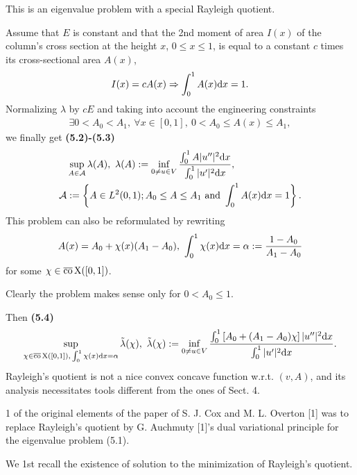 \documentclass{book}
\numberwithin{equation}{section}
\begin{document}
\begin{enumerate}
    This is an eigenvalue problem with a special Rayleigh quotient.
    
    Assume that $E$ is constant and that the 2nd moment of area $I(x)$ of the column's cross section at the height $x$, $0\le x\le 1$, is equal to a constant $c$ times its cross-sectional area $A(x)$,
    \begin{align*}
        I(x) = cA(x)\Rightarrow\int_0^1 A(x){\rm d}x = 1.
    \end{align*}
    Normalizing $\lambda$ by $cE$ and taking into account the engineering constraints
    \begin{align*}
        \exists 0 < A_0 < A_1,\ \forall x\in[0,1],\ 0 < A_0\le A(x)\le A_1,
    \end{align*}
    we finally get \textbf{(5.2)-(5.3)}
    \begin{align*}
        &\sup_{A\in\mathcal{A}} \lambda(A),\ \lambda(A) := \inf_{0\ne u\in V} \frac{\int_0^1 A|u''|^2{\rm d}x}{\int_0^1 |u'|^2{\rm d}x},\\
        \mathcal{A} &:= \left\{A\in L^2(0,1);A_0\le A\le A_1 \mbox{ and } \int_0^1 A(x){\rm d}x = 1\right\}.
    \end{align*}
    This problem can also be reformulated by rewriting
    \begin{align*}
        A(x) = A_0 + \chi(x)(A_1 - A_0),\ \int_0^1 \chi(x){\rm d}x = \alpha := \frac{1 - A_0}{A_1 - A_0}
    \end{align*}
    for some $\chi\in\overline{\rm co}\operatorname{X}([0,1])$.
    
    Clearly the problem makes sense only for $0 < A_0\le 1$.
    
    Then \textbf{(5.4)}
    \begin{align*}
        \sup_{\chi\in\overline{\rm co}\operatorname{X}([0,1]),\,\int_0^1 \chi(x){\rm d}x = \alpha} \tilde{\lambda}(\chi),\ \tilde{\lambda}(\chi) := \inf_{0\ne u\in V} \frac{\int_0^1 \left[A_0 + (A_1 - A_0)\chi\right]|u''|^2{\rm d}x}{\int_0^1 |u'|^2{\rm d}x}.
    \end{align*}
    Rayleigh's quotient is not a nice convex concave function w.r.t. $(v,A)$, and its analysis necessitates tools different from the ones of Sect. 4.
    
    1 of the original elements of the paper of S. J. Cox and M. L. Overton [1] was to replace Rayleigh's quotient by G. Auchmuty [1]'s dual variational principle for the eigenvalue problem (5.1).
    
    We 1st recall the existence of solution to the minimization of Rayleigh's quotient.
    

\end{enumerate}
\end{document}
